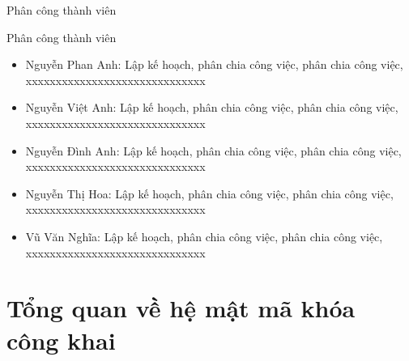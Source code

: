 \documentclass{beamer}
\begin{document}
\begin{frame}{Phân công thành viên}
\begin{block}{Phân công thành viên}
\begin{itemize}
\item Nguyễn Phan Anh: Lập kế hoạch, phân chia công việc, phân chia công việc, xxxxxxxxxxxxxxxxxxxxxxxxxxxxxx
\item Nguyễn Việt Anh: Lập kế hoạch, phân chia công việc, phân chia công việc, xxxxxxxxxxxxxxxxxxxxxxxxxxxxxx
\item Nguyễn Đình Anh: Lập kế hoạch, phân chia công việc, phân chia công việc, xxxxxxxxxxxxxxxxxxxxxxxxxxxxxx
\item Nguyễn Thị Hoa: Lập kế hoạch, phân chia công việc, phân chia công việc, xxxxxxxxxxxxxxxxxxxxxxxxxxxxxx
\item Vũ Văn Nghĩa: Lập kế hoạch, phân chia công việc, phân chia công việc, xxxxxxxxxxxxxxxxxxxxxxxxxxxxxx
\end{itemize}
\end{block}
\end{frame}
\section{Tổng quan về hệ mật mã khóa công khai}
\end{document}
